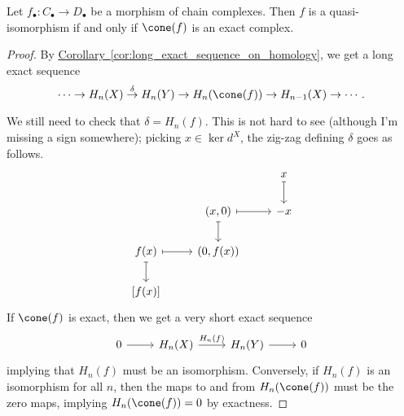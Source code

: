 \documentclass[main.tex]{subfiles}
\begin{document}
\begin{corollary}
  \label{cor:cone_controls_quasi_isomorphism}
  Let $f_{\bullet}\colon C_{\bullet} \to D_{\bullet}$ be a morphism of chain complexes. Then $f$ is a quasi-isomorphism if and only if $\cone(f)$ is an exact complex.
\end{corollary}
\begin{proof}
  By \hyperref[cor:long_exact_sequence_on_homology]{Corollary~\ref*{cor:long_exact_sequence_on_homology}}, we get a long exact sequence
  \begin{equation*}
    \cdots \to  H_{n}(X) \overset{\delta}{\to} H_{n}(Y) \to H_{n}(\cone(f)) \to H_{n-1}(X) \to \cdots.
  \end{equation*}

  We still need to check that $\delta = H_{n}(f)$. This is not hard to see (although I'm missing a sign somewhere); picking $x \in \ker d^{X}$, the zig-zag defining $\delta$ goes as follows.
  \begin{equation*}
    \begin{tikzcd}
      && x
      \arrow[d, mapsto]
      \\
      & (x, 0)
      \arrow[r, mapsto]
      \arrow[d, mapsto]
      & -x
      \\
      f(x)
      \arrow[r, mapsto]
      \arrow[d, mapsto]
      & (0, f(x))
      \\
      {[f(x)]}
    \end{tikzcd}
  \end{equation*}
  If $\cone(f)$ is exact, then we get a very short exact sequence
  \begin{equation*}
    \begin{tikzcd}
      0
      \arrow[r]
      & H_{n}(X)
      \arrow[r, "H_{n}(f)"]
      & H_{n}(Y)
      \arrow[r]
      & 0
    \end{tikzcd}
  \end{equation*}
  implying that $H_{n}(f)$ must be an isomorphism. Conversely, if $H_{n}(f)$ is an isomorphism for all $n$, then the maps to and from $H_{n}(\cone(f))$ must be the zero maps, implying $H_{n}(\cone(f)) = 0$ by exactness.
\end{proof}
\end{document}
